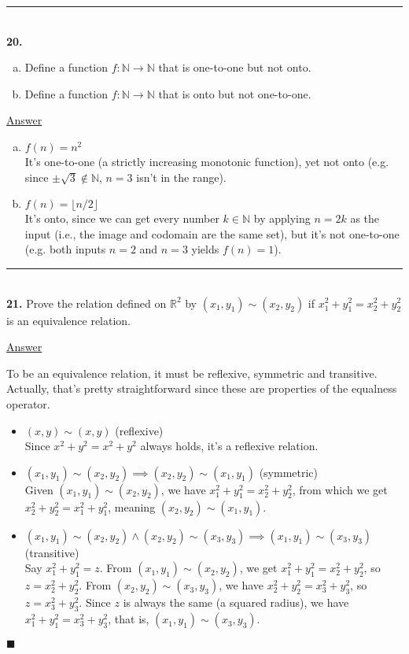 \documentclass{article}[10pt]
\newenvironment{exercise}[1]
    {\noindent\rule{2cm}{0.4pt} \\
     \textbf{#1.}}
    {}
\newcommand{\answer}{

  \underline{Answer}

}
\newcommand{\qed}{

\hfill\ensuremath{\blacksquare}

}
\begin{document}
\begin{exercise}{20}
  \begin{enumerate}[(a)]
    \item Define a function $f : \mathds{N} \to \mathds{N}$
          that is one-to-one but not onto.
    \item Define a function $f : \mathds{N} \to \mathds{N}$
          that is onto but not one-to-one.
  \end{enumerate}
  \answer
  \begin{enumerate}[(a)]
    \item $f(n) = n^2$ \\
      It's one-to-one (a strictly increasing monotonic function),
      yet not onto (e.g. since $\pm \sqrt{3} \notin \mathds{N}$,
                         $n = 3$ isn't in the range).
    \item $f(n) = \lfloor n / 2 \rfloor$ \\
      It's onto, since we can get every number $k \in \mathds{N}$
      by applying $n = 2 k$ as the input
      (i.e., the image and codomain are the same set),
      but it's not one-to-one (e.g. both inputs $n = 2$ and $n = 3$
                                    yields $f(n) = 1$).
  \end{enumerate}
\end{exercise}


\begin{exercise}{21}
  Prove the relation defined on $\mathds{R}^2$ by
  $(x_1, y_1) \sim (x_2, y_2)$ if $x_1^2 + y_1^2 = x_2^2 + y_2^2$
  is an equivalence relation.
  \answer
  To be an equivalence relation, it must be
  reflexive, symmetric and transitive.
  Actually, that's pretty straightforward
  since these are properties of the equalness operator.
  \begin{itemize}
    \item $(x, y) \sim (x, y)$ (reflexive) \\
      Since $x^2 + y^2 = x^2 + y^2$ always holds,
      it's a reflexive relation.
    \item $(x_1, y_1) \sim (x_2, y_2) \implies
           (x_2, y_2) \sim (x_1, y_1)$ (symmetric) \\
      Given $(x_1, y_1) \sim (x_2, y_2)$,
      we have $x_1^2 + y_1^2 = x_2^2 + y_2^2$,
      from which we get $x_2^2 + y_2^2 = x_1^2 + y_1^2$,
      meaning $(x_2, y_2) \sim (x_1, y_1)$.
    \item $(x_1, y_1) \sim (x_2, y_2) \land (x_2, y_2) \sim (x_3, y_3)
           \implies (x_1, y_1) \sim (x_3, y_3)$ (transitive) \\
      Say $x_1^2 + y_1^2 = z$.
      From $(x_1, y_1) \sim (x_2, y_2)$,
      we get $x_1^2 + y_1^2 = x_2^2 + y_2^2$,
      so $z = x_2^2 + y_2^2$.
      From $(x_2, y_2) \sim (x_3, y_3)$,
      we have $x_2^2 + y_2^2 = x_3^2 + y_3^2$,
      so $z = x_3^2 + y_3^2$.
      Since $z$ is always the same (a squared radius),
      we have $x_1^2 + y_1^2 = x_3^2 + y_3^2$,
      that is, $(x_1, y_1) \sim (x_3, y_3)$.
  \end{itemize}
  \qed
\end{exercise}
\end{document}
